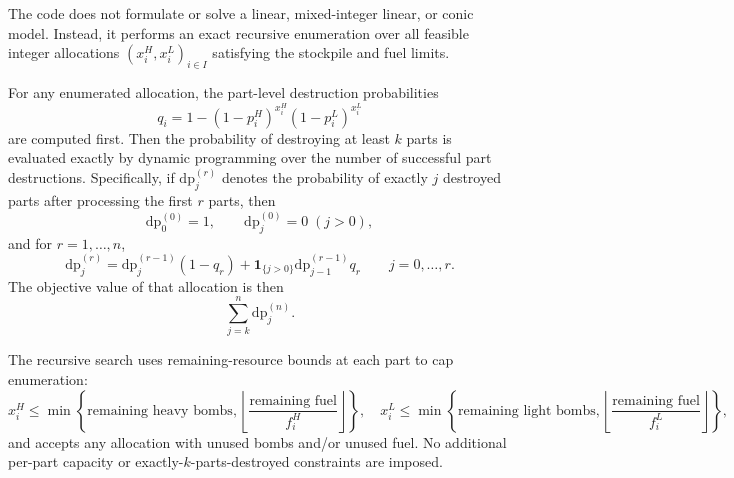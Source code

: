 The code does not formulate or solve a linear, mixed-integer linear, or conic model. Instead, it performs an exact recursive enumeration over all feasible integer allocations $(x_i^H,x_i^L)_{i\in I}$ satisfying the stockpile and fuel limits.

For any enumerated allocation, the part-level destruction probabilities
\[
q_i=1-(1-p_i^H)^{x_i^H}(1-p_i^L)^{x_i^L}
\]
are computed first. Then the probability of destroying at least $k$ parts is evaluated exactly by dynamic programming over the number of successful part destructions. Specifically, if $\mathrm{dp}^{(r)}_j$ denotes the probability of exactly $j$ destroyed parts after processing the first $r$ parts, then
\[
\mathrm{dp}^{(0)}_0=1,\qquad \mathrm{dp}^{(0)}_j=0 \; (j>0),
\]
and for $r=1,\dots,n$,
\[
\mathrm{dp}^{(r)}_j
=
\mathrm{dp}^{(r-1)}_j(1-q_r)
+
\mathbf{1}_{\{j>0\}}\mathrm{dp}^{(r-1)}_{j-1}q_r
\qquad j=0,\dots,r.
\]
The objective value of that allocation is then
\[
\sum_{j=k}^{n} \mathrm{dp}^{(n)}_j.
\]

The recursive search uses remaining-resource bounds at each part to cap enumeration:
\[
x_i^H \le \min\!\left\{\text{remaining heavy bombs},\left\lfloor \frac{\text{remaining fuel}}{f_i^H}\right\rfloor\right\},
\quad
x_i^L \le \min\!\left\{\text{remaining light bombs},\left\lfloor \frac{\text{remaining fuel}}{f_i^L}\right\rfloor\right\},
\]
and accepts any allocation with unused bombs and/or unused fuel. No additional per-part capacity or exactly-$k$-parts-destroyed constraints are imposed.
